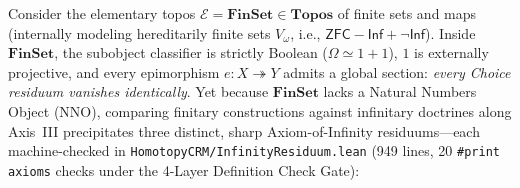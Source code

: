 \documentclass[10pt,twoside,openright]{book}
\theoremstyle{crmplain}
\theoremstyle{crmdef}
\theoremstyle{crmremark}
\begin{document}
Consider the elementary topos $\mathcal{E} = \mathbf{FinSet} \in \mathbf{Topos}$ of finite sets and maps (internally modeling hereditarily finite sets $V_\omega$, i.e., $\mathsf{ZFC} - \mathsf{Inf} + \neg\mathsf{Inf}$). Inside $\mathbf{FinSet}$, the subobject classifier is strictly Boolean ($\Omega \simeq 1+1$), $1$ is externally projective, and every epimorphism $e : X \twoheadrightarrow Y$ admits a global section: \emph{every Choice residuum vanishes identically}. Yet because $\mathbf{FinSet}$ lacks a Natural Numbers Object ($\mathrm{NNO}$), comparing finitary constructions against infinitary doctrines along Axis~III precipitates three distinct, sharp Axiom-of-Infinity residuums---each machine-checked in \texttt{HomotopyCRM/\allowbreak InfinityResiduum.lean} (949 lines, 20 \texttt{\#print axioms} checks under the 4-Layer Definition Check Gate):
\end{document}
